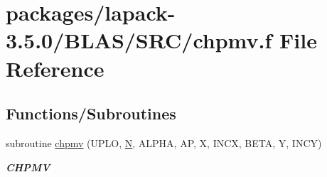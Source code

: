 \hypertarget{lapack-3_85_80_2BLAS_2SRC_2chpmv_8f}{}\section{packages/lapack-\/3.5.0/\+B\+L\+A\+S/\+S\+R\+C/chpmv.f File Reference}
\label{lapack-3_85_80_2BLAS_2SRC_2chpmv_8f}
\subsection*{Functions/\+Subroutines}
\begin{DoxyCompactItemize}
\item 
subroutine \hyperlink{group__complex__blas__level2_gad1dc14308bf0c1c8d9ba6ee068ac4d60}{chpmv} (U\+P\+L\+O, \hyperlink{polmisc_8c_a0240ac851181b84ac374872dc5434ee4}{N}, A\+L\+P\+H\+A, A\+P, X, I\+N\+C\+X, B\+E\+T\+A, Y, I\+N\+C\+Y)
\begin{DoxyCompactList}\small\item\em {\bfseries C\+H\+P\+M\+V} \end{DoxyCompactList}\end{DoxyCompactItemize}
